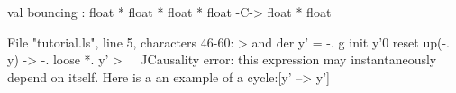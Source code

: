 \runverbatimfalse
{}
\begin{RunVerbatimMsg}
val bouncing : float * float * float * float -C-> float * float
\end{RunVerbatimMsg}
\begin{RunVerbatimErr}
File "tutorial.ls", line 5, characters 46-60:
> and der y' = -. g init y'0 reset up(-. y) -> -. loose *. y'
>                                              ^^^^^^^^^^^^^^
Causality error: this expression may instantaneously depend on itself.
Here is a an example of a cycle:[y' --> y']
\end{RunVerbatimErr}
